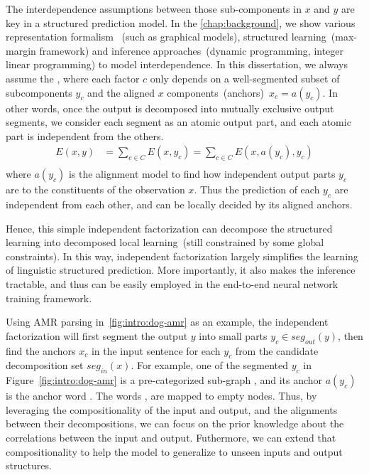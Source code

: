 The interdependence assumptions between those sub-components in $x$
and $y$ are key in a structured prediction model. In the
\autoref{chap:background}, we show various representation formalism
~(such as graphical models), structured learning~(max-margin
framework) and inference approaches~(dynamic programming, integer
linear programming) to model interdependence. In this dissertation, we
always assume the , where each factor
$c$ only depends on a well-segmented subset of subcomponents $y_{c}$
and the aligned $x$ components~(anchors)~$x_{c}=a(y_{c})$. In other
words, once the output is decomposed into mutually exclusive output
segments, we consider each segment as an atomic output part, and each
atomic part is independent from the others.
\begin{equation}
    \label{eq:independent-factor}
    \begin{split}
    E(x, y) & =\sum_{c \in C} E(x, y_{c}) = \sum_{c \in C}E(x, a(y_{c}), y_{c})  \\
    \end{split}
\end{equation}
where $a(y_{c})$ is the alignment model to find how independent output
parts $y_{c}$ are  to the constituents of the observation
$x$. Thus the prediction of each $y_{c}$ are independent from each
other, and can be locally decided by its aligned anchors.

Hence, this simple independent factorization can decompose the
structured learning into decomposed local learning~(still constrained
by some global constraints). In this way, independent factorization
largely simplifies the learning of linguistic structured
prediction. More importantly, it also makes the inference tractable,
and thus can be easily employed in the end-to-end neural network
training framework.

Using AMR parsing in~\autoref{fig:intro:dog-amr} as an example, the
independent factorization will first segment the output $y$ into small
parts $y_{c} \in seg_{out}(y)$, then find the anchors $x_{c}$ in the
input sentence for each $y_{c}$ from the candidate decomposition set
$seg_{in}(x)$. For example, one of the segmented $y_{c}$ in
Figure~\ref{fig:intro:dog-amr} is a pre-categorized sub-graph
, and its anchor $a(y_{c})$ is the
anchor word . The words , 
are mapped to empty nodes.  Thus, by leveraging the compositionality
of the input and output, and the alignments between their
decompositions, we can focus on the prior knowledge about the
correlations between the input and output. Futhermore, we can extend
that compositionality to help the model to generalize to unseen inputs
and output structures.

